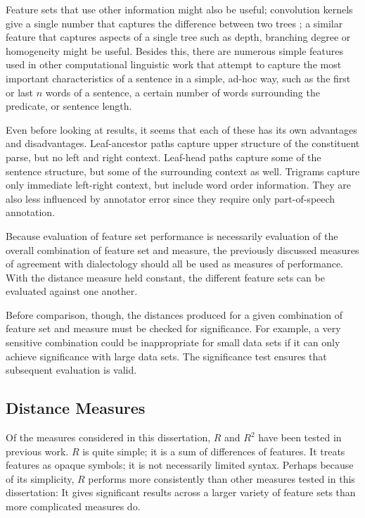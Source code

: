 Feature sets that use other information might also be useful;
convolution kernels give a single number that captures the difference
between two trees \cite{collins01}; a similar feature that captures
aspects of a single tree such as depth, branching degree or
homogeneity might be useful. Besides this, there are numerous simple
features used in other computational linguistic work that attempt to
capture the most important characteristics of a sentence in a simple,
ad-hoc way, such as the first or last $n$ words of a sentence, a
certain number of words surrounding the predicate, or sentence length.

Even before looking at results, it seems that each of these has its
own advantages and disadvantages. Leaf-ancestor paths capture upper
structure of the constituent parse, but no left and right
context. Leaf-head paths capture some of the sentence structure, but
some of the surrounding context as well. Trigrams capture only
immediate left-right context, but include word order information. They
are also less influenced by annotator error since they require only
part-of-speech annotation.

Because evaluation of feature set performance is necessarily evaluation
of the overall combination of feature set and measure, the previously
discussed measures of agreement with dialectology should all be used
as measures of performance. With the distance measure held constant,
the different feature sets can be evaluated against one another.

Before comparison, though, the distances produced for a given
combination of feature set and measure must be checked for
significance. For example, a very sensitive combination could be
inappropriate for small data sets if it can only achieve significance
with large data sets. The significance test ensures that subsequent
evaluation is valid.

\subsection{Distance Measures}

Of the measures considered in this dissertation, $R$ and $R^2$ have
been tested in previous work. $R$ is quite simple; it is a sum of
differences of features. It treats features as opaque symbols; it is
not necessarily limited syntax. Perhaps because of its simplicity, $R$
performs more consistently than other measures tested in this
dissertation: It gives significant results across a larger variety of
feature sets than more complicated measures do.

